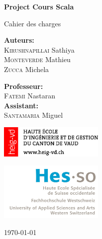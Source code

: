 \begin{titlepage}
    \begin{center}

	 \vspace{0.5cm}
     {\fontsize{1.5cm}{1.8cm} \bf Project Cours Scala}\par
     \vspace{0.5cm}
     {\fontsize{0.9cm}{1.3cm} \selectfont Cahier des charges}\par
     \vspace{3cm}
     \vfill
        
        \begin{minipage}{0.4\textwidth}
        	\begin{flushleft} \large
        		\textbf{Auteurs:}\\
        		\textsc{Kirushnapillai} Sathiya \\
        		\textsc{Monteverde} Mathieu \\
        		\textsc{Zucca} Michela
        	\end{flushleft}
        \end{minipage}
        \begin{minipage}{0.4\textwidth}
            \begin{flushright} \large
                \textbf{Professeur:} \\
                \textsc{Fatemi} Nastaran \\
                \textbf{Assistant:} \\
                \textsc{Santamaria} Miguel  
            \end{flushright}
        \end{minipage}
    
        \vfill
    \begin{minipage}{0.4\textwidth}
    	\begin{flushleft} \large
       		\includegraphics[width=5cm]{images/logo_heig.png}
        \end{flushleft}

	\end{minipage}
	\begin{minipage}{0.4\textwidth}
	    \begin{flushright}
			\includegraphics[width=5cm]{images/logo-hes-so.jpg}
		\end{flushright}
	\end{minipage}


        \today
        
    \end{center}
\end{titlepage}
